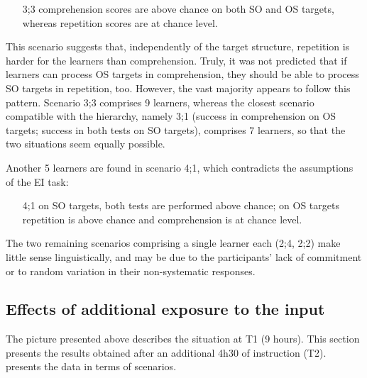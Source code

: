 \begin{itemize}
    \item[3;3]  comprehension scores are above chance on both SO and OS targets, whereas repetition scores are at chance level. 
\end{itemize}

This scenario suggests that, independently of the target structure, repetition is harder for the learners than comprehension. Truly, it was not predicted that if learners can process OS targets in comprehension, they should be able to process SO targets in repetition, too. However, the vast majority appears to follow this pattern. Scenario 3;3 comprises 9 learners, whereas the closest scenario compatible with the hierarchy, namely 3;1 (success in comprehension on OS targets; success in both tests on SO targets), comprises 7 learners, so that the two situations seem equally possible. 

Another 5 learners are found in scenario 4;1, which contradicts the assumptions of the EI task: 

\begin{itemize}
    \item[4;1]  on SO targets, both tests are performed above chance; on OS targets repetition is above chance and comprehension is at chance level. 
\end{itemize}

The two remaining scenarios comprising a single learner each (2;4, 2;2) make little sense linguistically, and may be due to the participants’ lack of commitment or to random variation in their non-systematic responses. 

\subsection{Effects of additional exposure to the input}\label{sec:06:3.1}

The picture presented above describes the situation at T1 (9 hours). This section presents the results obtained after an additional 4h30 of instruction (T2).  presents the data in terms of scenarios.

